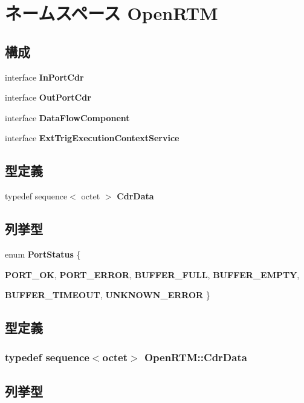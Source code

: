 \section{ネームスペース OpenRTM}
\label{namespaceOpenRTM}
\subsection*{構成}
\begin{DoxyCompactItemize}
\item 
interface {\bf InPortCdr}
\item 
interface {\bf OutPortCdr}
\item 
interface {\bf DataFlowComponent}
\item 
interface {\bf ExtTrigExecutionContextService}
\end{DoxyCompactItemize}
\subsection*{型定義}
\begin{DoxyCompactItemize}
\item 
typedef sequence$<$ octet $>$ {\bf CdrData}
\end{DoxyCompactItemize}
\subsection*{列挙型}
\begin{DoxyCompactItemize}
\item 
enum {\bf PortStatus} \{ \par
{\bf PORT\_\-OK}, 
{\bf PORT\_\-ERROR}, 
{\bf BUFFER\_\-FULL}, 
{\bf BUFFER\_\-EMPTY}, 
\par
{\bf BUFFER\_\-TIMEOUT}, 
{\bf UNKNOWN\_\-ERROR}
 \}
\end{DoxyCompactItemize}


\subsection{型定義}
\subsubsection[{CdrData}]{\setlength{\rightskip}{0pt plus 5cm}typedef sequence$<$octet$>$ {\bf OpenRTM::CdrData}}\label{namespaceOpenRTM_af5b607daef2b061583ed6fc579b62338}


\subsection{列挙型}
